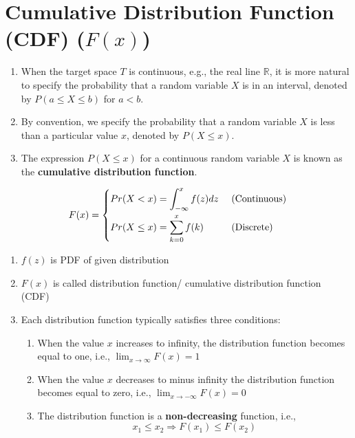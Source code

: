 \section{Cumulative Distribution Function (CDF) ($F(x)$) \cite{ism-1,mfml-1}}\label{Cumulative Distribution Function (CDF)}

\begin{enumerate}
    \item When the target space $T$ is continuous, e.g., the real line $\mathbb{R}$, it is more natural to specify the probability that a random variable $X$ is in an interval, denoted by $P(a \leq X \leq b)$ for $a < b$. \cite{mfml-1}
    \item By convention, we specify the probability that a random variable $X$ is less than a particular value $x$, denoted by $P(X \leq x)$. \cite{mfml-1}
    \item The expression $P(X \leq x)$ for a continuous random variable $X$ is known as the \textbf{cumulative distribution function}. \cite{mfml-1}

\end{enumerate}

\begin{align*}
    F(x) 
    = \begin{cases}
        Pr(X < x) = \displaystyle\int_{-\infty}^{x} f(z) dz & \text{ (Continuous)}\\[2ex]
        Pr(X \leq x) = \displaystyle\sum_{k=0}^x f(k) & \text{ (Discrete)}\\
    \end{cases}
\end{align*}


\begin{enumerate}
    \item $f(z)$ is PDF of given distribution

    \item $F(x)$ is called distribution function/ cumulative distribution function (CDF)

    \item Each distribution function typically satisfies three conditions:
    \begin{enumerate}
        \item When the value $x$ increases to infinity, the distribution function becomes equal to one, i.e., $\displaystyle\lim_{x\to \infty} F(x) = 1$

        \item When the value $x$ decreases to minus infinity the distribution function becomes equal to zero, i.e., $\displaystyle\lim_{x\to-\infty} F(x) = 0$

        \item The distribution function is a \textbf{non-decreasing} function, i.e.,
        \[
            x_1 \leq x_2 \Rightarrow F(x_1) \leq F(x_2)
        \]
        
    \end{enumerate}
    
\end{enumerate}

